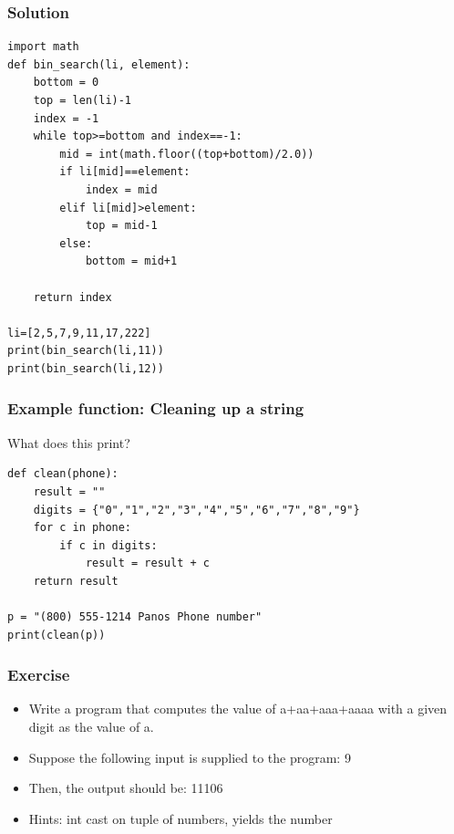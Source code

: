\begin{frame}[fragile]\frametitle{Solution}
\begin{lstlisting}
import math
def bin_search(li, element):
    bottom = 0
    top = len(li)-1
    index = -1
    while top>=bottom and index==-1:
        mid = int(math.floor((top+bottom)/2.0))
        if li[mid]==element:
            index = mid
        elif li[mid]>element:
            top = mid-1
        else:
            bottom = mid+1

    return index

li=[2,5,7,9,11,17,222]
print(bin_search(li,11))
print(bin_search(li,12))
\end{lstlisting}
\end{frame}

\begin{frame}[fragile]\frametitle{Example function: Cleaning up a string}
What does this print?
\begin{lstlisting}
def clean(phone):
    result = ""
    digits = {"0","1","2","3","4","5","6","7","8","9"}
    for c in phone:
        if c in digits:
            result = result + c
    return result

p = "(800) 555-1214 Panos Phone number"
print(clean(p))
\end{lstlisting}
\end{frame}

%

\begin{frame}[fragile]\frametitle{Exercise}
  \begin{itemize}
  \item Write a program that computes the value of a+aa+aaa+aaaa with a given digit as the value of a.
  \item Suppose the following input is supplied to the program: 9
  \item Then, the output should be: 11106
  \item Hints: int cast on tuple of numbers, yields the number

  \end{itemize}  
\end{frame}

